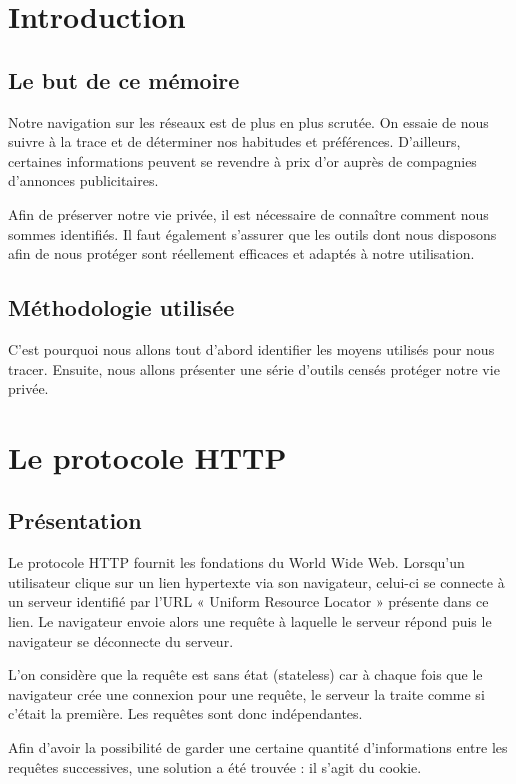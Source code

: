 \documentclass[a4paper,12pt,french]{report}
\begin{document}
\tableofcontents

\chapter{Introduction}
	\section{Le but de ce mémoire}
		Notre navigation sur les réseaux est de plus en plus scrutée. On essaie de nous suivre à la trace et de déterminer nos habitudes et préférences. D'ailleurs, certaines informations peuvent se revendre à prix d'or auprès de compagnies d'annonces publicitaires.
		
		Afin de préserver notre vie privée, il est nécessaire de connaître comment nous sommes identifiés. Il faut également s'assurer que les outils dont nous disposons afin de nous protéger sont réellement efficaces et adaptés à notre utilisation.
		
	\section{Méthodologie utilisée}
		C'est pourquoi nous allons tout d'abord identifier les moyens utilisés pour nous tracer. Ensuite, nous allons présenter une série d'outils censés protéger notre vie privée.
		
\chapter{Le protocole HTTP}
	\section{Présentation}
		Le protocole HTTP fournit les fondations du World Wide Web. Lorsqu'un utilisateur clique sur un lien hypertexte via son navigateur, celui-ci se connecte à un serveur identifié par l'URL « Uniform Resource Locator » présente dans ce lien. Le navigateur envoie alors une requête à laquelle le serveur répond puis le navigateur se déconnecte du serveur.
		
		L'on considère que la requête est sans état (stateless) car à chaque fois que le navigateur crée une connexion pour une requête, le serveur la traite comme si c'était la première. Les requêtes sont donc indépendantes.
		
		Afin d'avoir la possibilité de garder une certaine quantité d'informations entre les requêtes successives, une solution a été trouvée : il s'agit du cookie.
		
\end{document}
